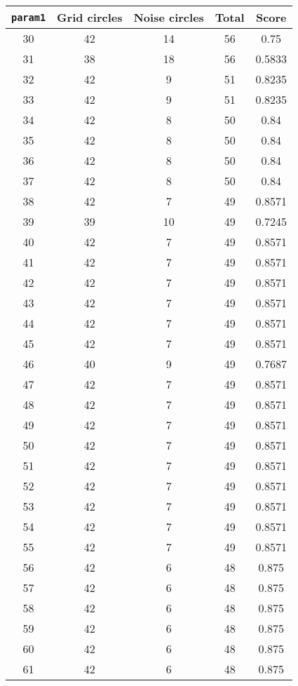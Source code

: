 \documentclass[letterpaper, 12pt]{article}
\begin{document}
\begin{longtable}{|c|c|c|c|c|}
\hline
\textbf{\texttt{param1}} & \textbf{Grid circles} & \textbf{Noise circles} & \textbf{Total} & \textbf{Score} \\
\hline
30 & 42 & 14 & 56 & 0.75 \\
\hline
31 & 38 & 18 & 56 & 0.5833 \\
\hline
32 & 42 & 9 & 51 & 0.8235 \\
\hline
33 & 42 & 9 & 51 & 0.8235 \\
\hline
34 & 42 & 8 & 50 & 0.84 \\
\hline
35 & 42 & 8 & 50 & 0.84 \\
\hline
36 & 42 & 8 & 50 & 0.84 \\
\hline
37 & 42 & 8 & 50 & 0.84 \\
\hline
38 & 42 & 7 & 49 & 0.8571 \\
\hline
39 & 39 & 10 & 49 & 0.7245 \\
\hline
40 & 42 & 7 & 49 & 0.8571 \\
\hline
41 & 42 & 7 & 49 & 0.8571 \\
\hline
42 & 42 & 7 & 49 & 0.8571 \\
\hline
43 & 42 & 7 & 49 & 0.8571 \\
\hline
44 & 42 & 7 & 49 & 0.8571 \\
\hline
45 & 42 & 7 & 49 & 0.8571 \\
\hline
46 & 40 & 9 & 49 & 0.7687 \\
\hline
47 & 42 & 7 & 49 & 0.8571 \\
\hline
48 & 42 & 7 & 49 & 0.8571 \\
\hline
49 & 42 & 7 & 49 & 0.8571 \\
\hline
50 & 42 & 7 & 49 & 0.8571 \\
\hline
51 & 42 & 7 & 49 & 0.8571 \\
\hline
52 & 42 & 7 & 49 & 0.8571 \\
\hline
53 & 42 & 7 & 49 & 0.8571 \\
\hline
54 & 42 & 7 & 49 & 0.8571 \\
\hline
55 & 42 & 7 & 49 & 0.8571 \\
\hline
56 & 42 & 6 & 48 & 0.875 \\
\hline
57 & 42 & 6 & 48 & 0.875 \\
\hline
58 & 42 & 6 & 48 & 0.875 \\
\hline
59 & 42 & 6 & 48 & 0.875 \\
\hline
60 & 42 & 6 & 48 & 0.875 \\
\hline
61 & 42 & 6 & 48 & 0.875 \\

\end{longtable}
\end{document}
